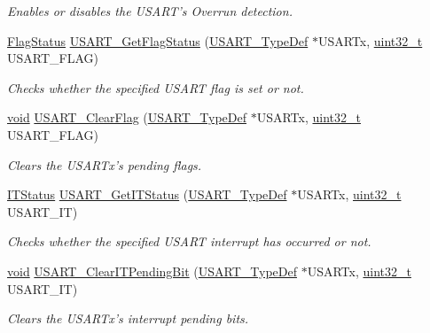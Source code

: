 \begin{DoxyCompactItemize}
\begin{DoxyCompactList}\small\item\em Enables or disables the U\-S\-A\-R\-T's Overrun detection. \end{DoxyCompactList}\item 
\hyperlink{group___exported__types_ga89136caac2e14c55151f527ac02daaff}{Flag\-Status} \hyperlink{group___u_s_a_r_t___group12_gac21f87775a39b4becd85cac19feab99a}{U\-S\-A\-R\-T\-\_\-\-Get\-Flag\-Status} (\hyperlink{struct_u_s_a_r_t___type_def}{U\-S\-A\-R\-T\-\_\-\-Type\-Def} $\ast$U\-S\-A\-R\-Tx, \hyperlink{stdint_8h_a435d1572bf3f880d55459d9805097f62}{uint32\-\_\-t} U\-S\-A\-R\-T\-\_\-\-F\-L\-A\-G)
\begin{DoxyCompactList}\small\item\em Checks whether the specified U\-S\-A\-R\-T flag is set or not. \end{DoxyCompactList}\item 
\hyperlink{group___n_a_m_e_ga18028b8badbf1ea7e704ccac3c488e82}{void} \hyperlink{group___u_s_a_r_t___group12_gad8e29d4db7e496c998e11856d38ab1b0}{U\-S\-A\-R\-T\-\_\-\-Clear\-Flag} (\hyperlink{struct_u_s_a_r_t___type_def}{U\-S\-A\-R\-T\-\_\-\-Type\-Def} $\ast$U\-S\-A\-R\-Tx, \hyperlink{stdint_8h_a435d1572bf3f880d55459d9805097f62}{uint32\-\_\-t} U\-S\-A\-R\-T\-\_\-\-F\-L\-A\-G)
\begin{DoxyCompactList}\small\item\em Clears the U\-S\-A\-R\-Tx's pending flags. \end{DoxyCompactList}\item 
\hyperlink{group___exported__types_gaacbd7ed539db0aacd973a0f6eca34074}{I\-T\-Status} \hyperlink{group___u_s_a_r_t___group12_ga0ec67ecd6862681c2a68d16c179d2b83}{U\-S\-A\-R\-T\-\_\-\-Get\-I\-T\-Status} (\hyperlink{struct_u_s_a_r_t___type_def}{U\-S\-A\-R\-T\-\_\-\-Type\-Def} $\ast$U\-S\-A\-R\-Tx, \hyperlink{stdint_8h_a435d1572bf3f880d55459d9805097f62}{uint32\-\_\-t} U\-S\-A\-R\-T\-\_\-\-I\-T)
\begin{DoxyCompactList}\small\item\em Checks whether the specified U\-S\-A\-R\-T interrupt has occurred or not. \end{DoxyCompactList}\item 
\hyperlink{group___n_a_m_e_ga18028b8badbf1ea7e704ccac3c488e82}{void} \hyperlink{group___u_s_a_r_t___group12_ga378476be9495ce645b215f11dac3c40d}{U\-S\-A\-R\-T\-\_\-\-Clear\-I\-T\-Pending\-Bit} (\hyperlink{struct_u_s_a_r_t___type_def}{U\-S\-A\-R\-T\-\_\-\-Type\-Def} $\ast$U\-S\-A\-R\-Tx, \hyperlink{stdint_8h_a435d1572bf3f880d55459d9805097f62}{uint32\-\_\-t} U\-S\-A\-R\-T\-\_\-\-I\-T)
\begin{DoxyCompactList}\small\item\em Clears the U\-S\-A\-R\-Tx's interrupt pending bits. \end{DoxyCompactList}\end{DoxyCompactItemize}


